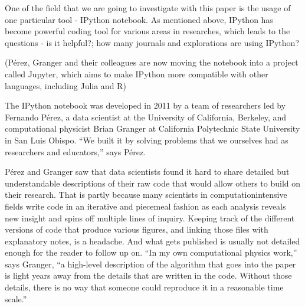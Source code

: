 
\cite{johansson2014introduction}

One of the field that we are going to investigate with this paper is the usage of one particular tool - IPython notebook. 
As mentioned above, IPython has become powerful coding tool for various areas in researches, which leads to the questions - is it helpful?; how many journals and explorations are using IPython? 

(Pérez,
Granger and their colleagues are now moving
the notebook into a project called Jupyter, which
aims to make IPython more compatible with
other languages, including Julia and R)

The IPython notebook was developed in 2011
by a team of researchers led by Fernando Pérez,
a data scientist at the University of California,
Berkeley, and computational physicist Brian
Granger at California Polytechnic State University
in San Luis Obispo. “We built it by solving
problems that we ourselves had as researchers
and educators,” says Pérez.

Pérez and Granger saw that data scientists
found it hard to share detailed but understandable
descriptions of their raw code that would
allow others to build on their research. That is
partly because many scientists in computationintensive
fields write code in an iterative and
piecemeal fashion as each analysis reveals new
insight and spins off multiple lines of inquiry.
Keeping track of the different versions of code
that produce various figures, and linking those
files with explanatory notes, is a headache.
And what gets published is usually not detailed
enough for the reader to follow up on. “In my
own computational physics work,” says Granger,
“a high-level description of the algorithm that
goes into the paper is light years away from
the details that are written in the code. Without
those details, there is no way that someone
could reproduce it in a reasonable time scale.”

